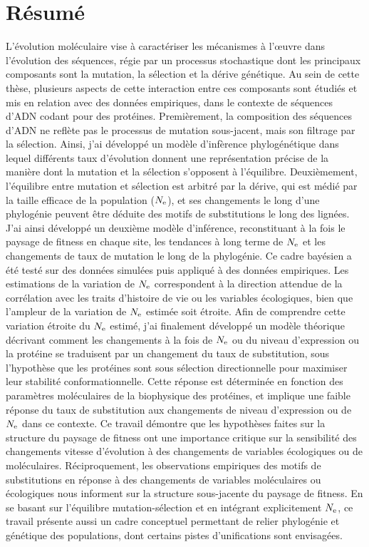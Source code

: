 \thispagestyle{empty}

\section*{Résumé}

L'évolution moléculaire vise à caractériser les mécanismes à l'œuvre dans l'évolution des séquences, régie par un processus stochastique dont les principaux composants sont la mutation, la sélection et la dérive génétique.
Au sein de cette thèse, plusieurs aspects de cette interaction entre ces composants sont étudiés et mis en relation avec des données empiriques, dans le contexte de séquences d'ADN codant pour des protéines.
Premièrement, la composition des séquences d'ADN ne reflète pas le processus de mutation sous-jacent, mais son filtrage par la sélection.
Ainsi, j'ai développé un modèle d'infèrence phylogénétique dans lequel différents taux d'évolution donnent une représentation précise de la manière dont la mutation et la sélection s'opposent à l'équilibre.
Deuxièmement, l'équilibre entre mutation et sélection est arbitré par la dérive, qui est médié par la taille efficace de la population ($N_{\textrm{e}}$), et ses changements le long d'une phylogénie peuvent être déduite des motifs de substitutions le long des lignées.
J'ai ainsi développé un deuxième modèle d'inférence, reconstituant à la fois le paysage de fitness en chaque site, les tendances à long terme de $N_{\textrm{e}}$ et les changements de taux de mutation le long de la phylogénie.
Ce cadre bayésien a été testé sur des données simulées puis appliqué à des données empiriques.
Les estimations de la variation de $N_{\textrm{e}}$ correspondent à la direction attendue de la corrélation avec les traits d’histoire de vie ou les variables écologiques, bien que l'ampleur de la variation de $N_{\textrm{e}}$ estimée soit étroite.
Afin de comprendre cette variation étroite du $N_{\textrm{e}}$ estimé, j'ai finalement développé un modèle théorique décrivant comment les changements à la fois de $N_{\textrm{e}}$ ou du niveau d'expression ou la protéine se traduisent par un changement du taux de substitution, sous l'hypothèse que les protéines sont sous sélection directionnelle pour maximiser leur stabilité conformationnelle.
Cette réponse est déterminée en fonction des paramètres moléculaires de la biophysique des protéines, et implique une faible réponse du taux de substitution aux changements de niveau d'expression ou de $N_{\textrm{e}}$ dans ce contexte.
Ce travail démontre que les hypothèses faites sur la structure du paysage de fitness ont une importance critique sur la sensibilité des changements vitesse d'évolution à des changements de variables écologiques ou de moléculaires.
Réciproquement, les observations empiriques des motifs de substitutions en réponse à des changements de variables moléculaires ou écologiques nous informent sur la structure sous-jacente du paysage de fitness.
En se basant sur l'équilibre mutation-sélection et en intégrant explicitement $N_{\textrm{e}}$, ce travail présente aussi un cadre conceptuel permettant de relier phylogénie et génétique des populations, dont certains pistes d'unifications sont envisagées.

